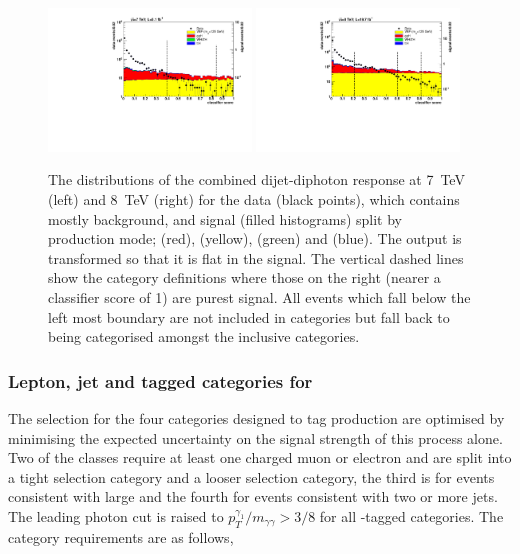 \begin{figure}
  \includegraphics[width=0.48\textwidth]{selec_and_cats/plots/mixedcombbdt_transformed_7TeV_fix.pdf}
  \includegraphics[width=0.48\textwidth]{selec_and_cats/plots/mixedcombbdt_transformed_8TeV_fix.pdf}
  \caption[The distribution of the combined dijet-diphoton \acs{BDT} response]{The distributions of the combined dijet-diphoton \BDT response at 7~TeV (left) and 8~TeV (right) for the data (black points), which contains mostly background, and signal (filled histograms) split by production mode; \ggH (red), \VBF (yellow), \VH (green) and \ttH (blue). The output is transformed so that it is flat in the \VBF signal. The vertical dashed lines show the \VBF category definitions where those on the right (nearer a classifier score of 1) are purest \VBF signal. All events which fall below the left most boundary are not included in \VBF categories but fall back to being categorised amongst the inclusive categories.}
  \label{fig:vbf_dijet_comb}
\end{figure}

\subsubsection{Lepton, jet and \MET tagged categories for \VH}
\label{sec:vh_tag}

The selection for the four categories designed to tag \VH production are optimised by minimising the expected uncertainty on the signal strength of this process alone. Two of the classes require at least one charged muon or electron and are split into a tight selection category and a looser selection category, the third is for events consistent with large \MET and the fourth for events consistent with two or more jets. The leading photon cut is raised to $p_{T}^{\gamma_{1}}/m_{\gamma\gamma}>3/8$ for all \VH-tagged categories. The category requirements are as follows,


